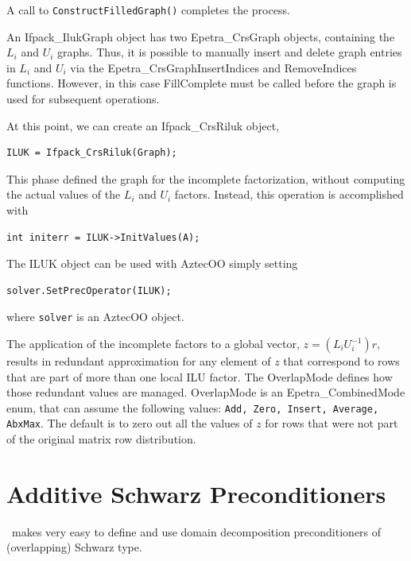 A call to \verb!ConstructFilledGraph()! completes the process.

\begin{remark}
  An Ifpack\_IlukGraph object has two Epetra\_CrsGraph objects,
  containing the $L_i$ and $U_i$ graphs. Thus, it is possible to
  manually insert and delete graph entries in $L_i$ and $U_i$ via the
  Epetra\_CrsGraphInsertIndices and RemoveIndices functions. However, in
  this case FillComplete must be called before the graph is used for
  subsequent operations.
\end{remark}

At this point, we can create an Ifpack\_CrsRiluk object,
\begin{verbatim}
ILUK = Ifpack_CrsRiluk(Graph);
\end{verbatim}
This phase defined the graph for the incomplete factorization, without
computing the actual values of the $L_i$ and $U_i$ factors. Instead,
this operation is accomplished with
\begin{verbatim}
int initerr = ILUK->InitValues(A);
\end{verbatim}
The ILUK object can be used with AztecOO simply setting
\begin{verbatim}
solver.SetPrecOperator(ILUK);
\end{verbatim}
where \verb!solver! is an AztecOO object.
\smallskip

\medskip

The application of the incomplete factors to a global vector, $z =
(L_iU_i^{-1}) r$, results in redundant approximation for any element of
$z$ that correspond to rows that are part of more than one local ILU
factor. The OverlapMode defines how those redundant values are managed.
OverlapMode is an Epetra\_CombinedMode enum, that can assume the
following values: {\tt Add, Zero, Insert, Average, AbxMax}. The default
is to zero out all the values of $z$ for rows that were not part of the
original matrix row distribution.

\section{Additive Schwarz Preconditioners}
\label{sec:additive}

\ifpack\ makes very easy to define and use domain decomposition
preconditioners of (overlapping) Schwarz type.

